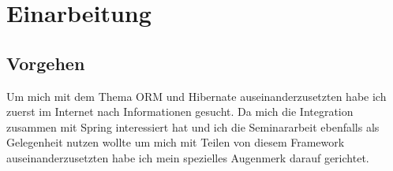 \chapter{Einarbeitung}
\label{sec:Einarbeitung}

\section{Vorgehen}
Um mich mit dem Thema ORM und Hibernate auseinanderzusetzten habe ich zuerst im Internet nach Informationen gesucht. Da mich die Integration zusammen mit Spring interessiert hat und ich die Seminararbeit ebenfalls als Gelegenheit nutzen wollte um mich mit Teilen von diesem Framework auseinanderzusetzten habe ich mein spezielles Augenmerk darauf gerichtet.